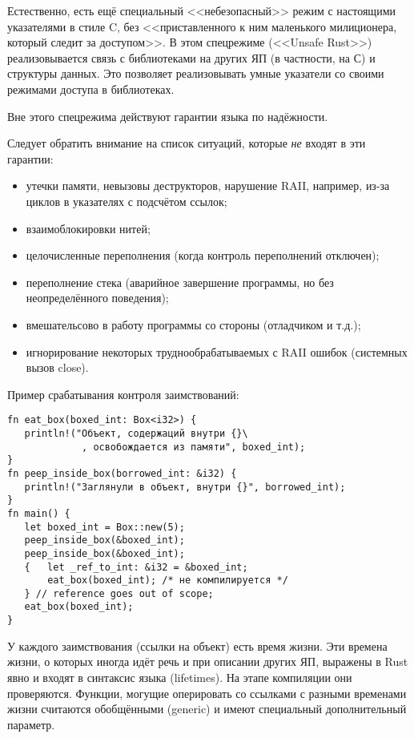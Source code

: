 \documentclass[10pt, a5paper]{article}
\begin{document}
Естественно, есть ещё специальный <<небезопасный>> режим с настоящими указателями в стиле C, без <<приставленного к ним маленького милиционера, который следит за доступом>>. В этом спецрежиме (<<Unsafe Rust>>) реализовывается связь с библиотеками на других ЯП (в частности, на С) и структуры данных. Это позволяет реализовывать умные указатели со своими режимами доступа в библиотеках.

Вне этого спецрежима действуют гарантии языка по надёжности.

Следует обратить внимание на список ситуаций, которые \emph{не} входят в эти гарантии:

\begin{itemize}
  \item утечки памяти, невызовы деструкторов, нарушение RAII, например, из-за циклов в указателях с подсчётом ссылок;
  \item взаимоблокировки нитей;
  \item целочисленные переполнения (когда контроль переполнений отключен);
  \item переполнение стека (аварийное завершение программы, но без неопределённого поведения);
  \item вмешательсово в работу программы со стороны (отладчиком и т.д.);
  \item игнорирование некоторых труднообрабатываемых с RAII ошибок (системных вызов close).
\end{itemize}

Пример срабатывания контроля заимствований:

\begin{verbatim}
fn eat_box(boxed_int: Box<i32>) {
   println!("Объект, содержаций внутри {}\
             , освобождается из памяти", boxed_int);
}
fn peep_inside_box(borrowed_int: &i32) {
   println!("Заглянули в объект, внутри {}", borrowed_int);
}
fn main() {
   let boxed_int = Box::new(5);
   peep_inside_box(&boxed_int);
   peep_inside_box(&boxed_int);
   {   let _ref_to_int: &i32 = &boxed_int;
       eat_box(boxed_int); /* не компилируется */ 
   } // reference goes out of scope;
   eat_box(boxed_int);
}\end{verbatim}
У каждого заимствования (ссылки на объект) есть время жизни. Эти времена жизни,
о которых иногда идёт речь и при описании других ЯП, выражены в Rust явно и входят
в синтаксис языка (lifetimes). На этапе компиляции они проверяются. Функции, 
могущие оперировать со ссылками с разными временами жизни считаются обобщёнными
(generic) и имеют специальный дополнительный параметр.
\end{document}

